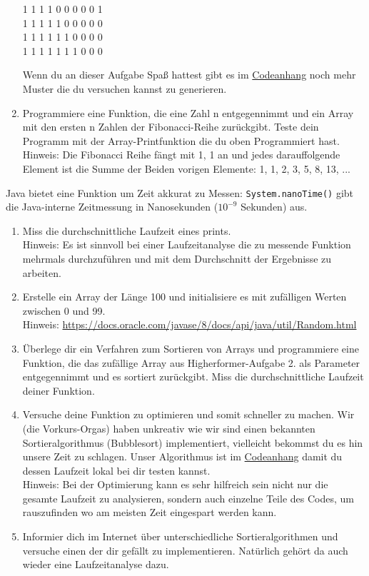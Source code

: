 \documentclass{../../sheet}
\begin{document}
\begin{enumerate}
\begin{ausgabe}
              1 1 1 1 0 0 0 0 0 1 \\
              1 1 1 1 1 0 0 0 0 0 \\
              1 1 1 1 1 1 0 0 0 0 \\
              1 1 1 1 1 1 1 0 0 0
          \end{ausgabe}
          Wenn du an dieser Aufgabe Spaß hattest gibt es im \hyperlink{Aufgabe_4}{Codeanhang} noch mehr Muster die du versuchen kannst zu generieren.
    \item Programmiere eine Funktion, die eine Zahl n entgegennimmt und ein Array mit den ersten n Zahlen der Fibonacci-Reihe zurückgibt. Teste dein Programm mit der Array-Printfunktion die du oben Programmiert hast.\\
          Hinweis: Die Fibonacci Reihe fängt mit 1, 1 an und jedes darauffolgende Element ist die Summe der Beiden vorigen Elemente: 1, 1, 2, 3, 5, 8, 13, ...

\end{enumerate}

\newpage
{}
Java bietet eine Funktion um Zeit akkurat zu Messen: \texttt{System.nanoTime()} gibt die Java-interne Zeitmessung in Nanosekunden ($10^{-9}$ Sekunden) aus.
\begin{enumerate}
    \item Miss die durchschnittliche Laufzeit eines prints.\\
    Hinweis: Es ist sinnvoll bei einer Laufzeitanalyse die zu messende Funktion mehrmals durchzuführen und mit dem Durchschnitt der Ergebnisse zu arbeiten.
    \item Erstelle ein Array der Länge 100 und initialisiere es mit zufälligen Werten zwischen 0 und 99.\\
          Hinweis: \url{https://docs.oracle.com/javase/8/docs/api/java/util/Random.html}
    \item Überlege dir ein Verfahren zum Sortieren von Arrays und programmiere eine Funktion, die das zufällige Array aus Higherformer-Aufgabe 2. als Parameter entgegennimmt und es sortiert zurückgibt. Miss die durchschnittliche Laufzeit deiner Funktion.          
    \item Versuche deine Funktion zu optimieren und somit schneller zu machen. Wir (die Vorkurs-Orgas) haben unkreativ wie wir sind einen bekannten Sortieralgorithmus (Bubblesort) implementiert, vielleicht bekommst du es hin unsere Zeit zu schlagen. Unser Algorithmus ist im \hyperlink{Highperformer}{Codeanhang} damit du dessen Laufzeit lokal bei dir testen kannst.\\
          Hinweis: Bei der Optimierung kann es sehr hilfreich sein nicht nur die gesamte Laufzeit zu analysieren, sondern auch einzelne Teile des Codes, um rauszufinden wo am meisten Zeit eingespart werden kann.
    \item Informier dich im Internet über unterschiedliche Sortieralgorithmen und versuche einen der dir gefällt zu implementieren. Natürlich gehört da auch wieder eine Laufzeitanalyse dazu.
\end{enumerate}
\end{document}
